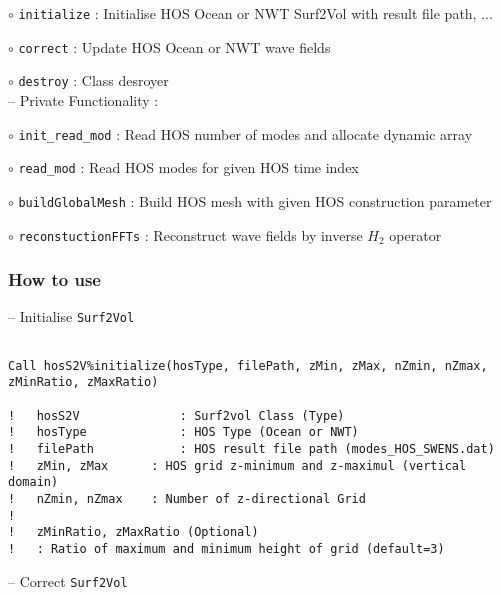 \hspace{1.0 cm} $\circ$ \texttt{initialize} : Initialise HOS Ocean or NWT Surf2Vol with result file path, ...

\hspace{1.0 cm} $\circ$ \texttt{correct} : Update HOS Ocean or NWT wave fields

\hspace{1.0 cm} $\circ$ \texttt{destroy} : Class desroyer\\

\hspace{0.5 cm} -- Private Functionality :

\hspace{1.0 cm} $\circ$ \texttt{init\_read\_mod} : Read HOS number of modes and allocate dynamic array

\hspace{1.0 cm} $\circ$ \texttt{read\_mod} : Read HOS modes for given HOS time index

\hspace{1.0 cm} $\circ$ \texttt{buildGlobalMesh} : Build HOS mesh with given HOS construction parameter

\hspace{1.0 cm} $\circ$ \texttt{reconstuctionFFTs} : Reconstruct wave fields by inverse $H_2$ operator \\

\subsubsection{How to use}

\hspace{0.5 cm} -- Initialise \texttt{Surf2Vol}

\begin{lstlisting}[language={[95]Fortran}]

Call hosS2V%initialize(hosType, filePath, zMin, zMax, nZmin, nZmax, zMinRatio, zMaxRatio)

!	hosS2V				: Surf2vol Class (Type)
!	hosType				: HOS Type (Ocean or NWT)
!	filePath			: HOS result file path (modes_HOS_SWENS.dat)
!	zMin, zMax 		: HOS grid z-minimum and z-maximul (vertical domain)
!	nZmin, nZmax 	: Number of z-directional Grid	
!
!	zMinRatio, zMaxRatio (Optional)
!	: Ratio of maximum and minimum height of grid (default=3)
\end{lstlisting}		

\vspace{0.5cm}	

\hspace{0.5 cm} -- Correct \texttt{Surf2Vol}

